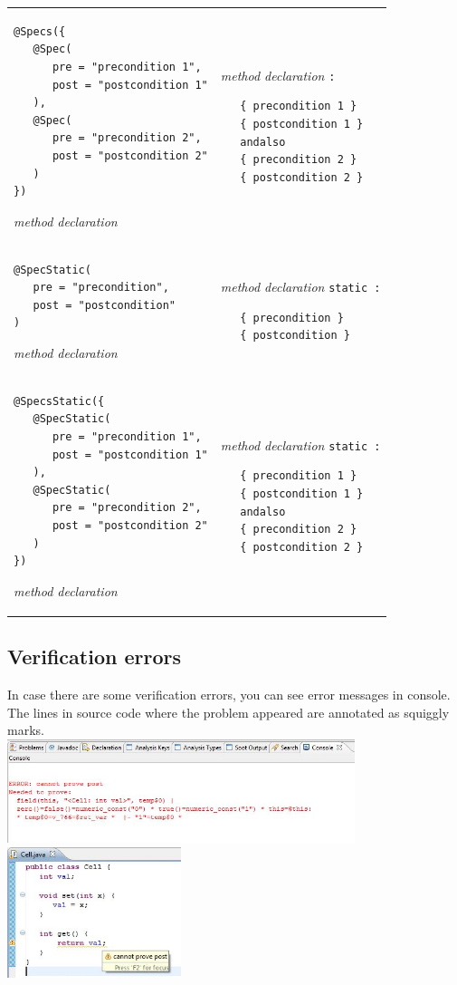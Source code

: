 \documentclass{article}
\begin{document}
\begin{longtable}{ m{7cm} | m{5cm} }
\begin{verbatim}
@Specs({
   @Spec(
      pre = "precondition 1", 
      post = "postcondition 1"
   ),
   @Spec(
      pre = "precondition 2", 
      post = "postcondition 2"
   )
})
\end{verbatim}
\it{method declaration}
&
{\it method declaration} \texttt{:}
\begin{verbatim}
   { precondition 1 }
   { postcondition 1 }
   andalso
   { precondition 2 }
   { postcondition 2 }
\end{verbatim}
\\
\begin{verbatim}
@SpecStatic(
   pre = "precondition", 
   post = "postcondition"
)
\end{verbatim}
\it{method declaration}
&
{\it method declaration} \texttt{static :}
\begin{verbatim}
   { precondition }
   { postcondition }
\end{verbatim}
\\
\begin{verbatim}
@SpecsStatic({
   @SpecStatic(
      pre = "precondition 1", 
      post = "postcondition 1"
   ),
   @SpecStatic(
      pre = "precondition 2", 
      post = "postcondition 2"
   )
})
\end{verbatim}
\it{method declaration}
&
{\it method declaration} \texttt{static :}
\begin{verbatim}
   { precondition 1 }
   { postcondition 1 }
   andalso
   { precondition 2 }
   { postcondition 2 }
\end{verbatim}
\end{longtable}

\subsection* {Verification errors}

In case there are some verification errors, you can see error messages in console. The lines in source code where the problem appeared are annotated as squiggly marks.\\

\includegraphics[width=4in]{images/console.jpg}\\

\includegraphics[width=2in]{images/marker.jpg}
\end{document}
